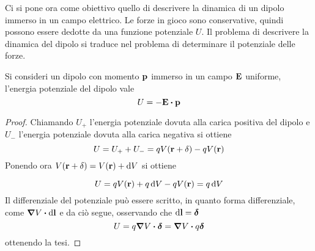 Ci si pone ora come obiettivo quello di descrivere la dinamica di un dipolo immerso in un campo elettrico.
Le forze in gioco sono conservative, quindi possono essere dedotte da una funzione potenziale $U$.
Il problema di descrivere la dinamica del dipolo si traduce nel problema di determinare il potenziale delle forze.
\begin{lemma}
    Si consideri un dipolo con momento $\vb{p}$ immerso in un campo $\vb{E}$ uniforme, l'energia potenziale del dipolo vale
    \begin{equation}
        \label{eqn:U_dipolo}
        U=-\vb{E}\vdot\vb{p}
    \end{equation}
\end{lemma}
\begin{proof}
    Chiamando $U_+$ l'energia potenziale dovuta alla carica positiva del dipolo
    e $U_-$ l'energia potenziale dovuta alla carica negativa si ottiene
    \[
        U=U_++U_-=qV(\vb{r}+\vb{\delta})-qV(\vb{r})
    \]
    Ponendo ora $V(\vb{r}+\vb{\delta})=V(\vb{r})+\dd{V}$ si ottiene

    \[
        U=qV(\vb{r})+q\dd{V}-qV(\vb{r})=q\dd{V}
    \]
    Il differenziale del potenziale può essere scritto, in quanto forma differenziale,
    come $\grad{V}\vdot\dd{\vb{l}}$ e da ciò segue, osservando che $\dd{\vb{l}}=\vb*{\delta}$
    \[
        U=q\grad{V}\vdot\vb*{\delta}=\grad{V}\vdot q\vb*{\delta}
    \]
    ottenendo la tesi.
\end{proof}

